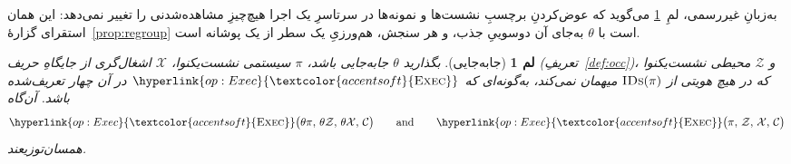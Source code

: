 \documentclass[10pt,oneside,openany]{book}
\newcommand{\Corr}{\mathcal{C}}
\newcommand{\Zenv}{\mathcal{Z}}
\newcommand{\op}[1]{\textnormal{\textsc{#1}}}
\newcommand{\opl}[1]{\hyperlink{op:#1}{\textcolor{accentsoft}{\op{#1}}}}
\newcommand{\IDs}{\op{IDs}}
\theoremstyle{accentdef}
\theoremstyle{accentplain}
\newtheorem{lemma}[definition]{لم}
\begin{document}
به‌زبانِ غیررسمی، لمِ~\ref{lem:reloc} می‌گوید که عوض‌کردنِ برچسبِ نشست‌ها و
نمونه‌ها در سرتاسرِ یک اجرا هیچ‌چیزِ مشاهده‌شدنی را تغییر نمی‌دهد: این همان
استقرای گزارهٔ~\ref{prop:regroup} است با $\theta$ به‌جای آن دوسوییِ جذب، و
هر سنجش، هم‌ورزیِ یک سطر از یک پوشانه است.

\begin{lemma}[جابه‌جایی]\label{lem:reloc}
بگذارید $\theta$ جابه‌جایی باشد، $\pi$ سیستمی نشست‌یکنوا، $\mathcal{X}$
اشغال‌گری از جایگاهِ حریف (تعریفِ~\ref{def:occ})، و $\Zenv$ محیطی
نشست‌یکنوا که در هیچ هویتی از $\IDs(\pi)$ میهمان نمی‌کند، به‌گونه‌ای که
$\opl{Exec}$ در آن چهار تعریف‌شده باشد. آن‌گاه
\[
  \opl{Exec}\bigl(\theta\pi,\,\theta\Zenv,\,\theta\mathcal{X},\,\Corr\bigr)
  \qquad\text{and}\qquad
  \opl{Exec}\bigl(\pi,\,\Zenv,\,\mathcal{X},\,\Corr\bigr)
\]
همسان‌توزیعند.
\end{lemma}
\end{document}

